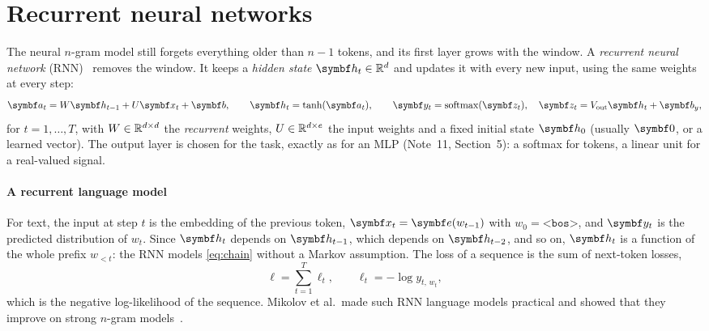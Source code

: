 \documentclass[11pt]{article}
\newcommand{\hv}{\vect{h}}
\newcommand{\av}{\vect{a}}
\newcommand{\bv}{\vect{b}}
\newcommand{\yv}{\vect{y}}
\newcommand{\zv}{\vect{z}}
\newcommand{\ev}{\vect{e}}
\newcommand{\softmax}{\operatorname{softmax}}
\newcommand{\bos}{\texttt{<bos>}}
\begin{document}
\section{Recurrent neural networks}\label{sec:rnn}

The neural $n$-gram model still forgets everything older than $n - 1$ tokens, and its first layer grows with the window.
A \emph{recurrent neural network} (RNN)~\cite{rumelhart1986,elman1990} removes the window. It keeps a \emph{hidden state}
$\hv_t \in \R^d$ and updates it with every new input, using the same weights at every step:
\begin{equation}\label{eq:rnn}
  \av_t = W\hv_{t-1} + U\x_t + \bv, \qquad \hv_t = \tanh(\av_t), \qquad
  \yv_t = \softmax(\zv_t), \quad \zv_t = V_{\mathrm{out}}\hv_t + \bv_y ,
\end{equation}
for $t = 1, \dots, T$, with $W \in \mathbb{R}^{d \times d}$ the \emph{recurrent} weights, $U \in \mathbb{R}^{d \times e}$ the input
weights and a fixed initial state $\hv_0$ (usually $\vect{0}$, or a learned vector). The output layer is chosen for the task,
exactly as for an MLP (Note~11, Section~5): a softmax for tokens, a linear unit for a real-valued signal.

\paragraph{A recurrent language model} For text, the input at step $t$ is the embedding of the previous token,
$\x_t = \ev(w_{t-1})$ with $w_0 = \bos$, and $\yv_t$ is the predicted distribution of $w_t$. Since $\hv_t$ depends on
$\hv_{t-1}$, which depends on $\hv_{t-2}$, and so on, $\hv_t$ is a function of the whole prefix $w_{<t}$: the RNN models
\eqref{eq:chain} without a Markov assumption. The loss of a sequence is the sum of next-token losses,
\begin{equation}\label{eq:loss}
  \ell = \sum_{t=1}^{T} \ell_t, \qquad \ell_t = -\log y_{t,\,w_t} ,
\end{equation}
which is the negative log-likelihood of the sequence. Mikolov et al.\ made such RNN language models practical and showed
that they improve on strong $n$-gram models~\cite{mikolov2010}.
\end{document}
